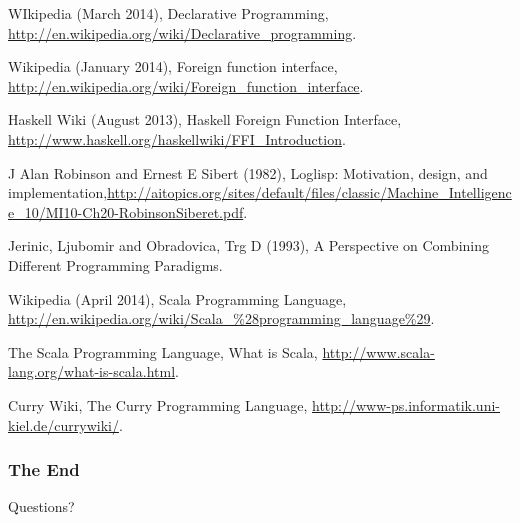 \documentclass[aspectratio=1610]{beamer}
\begin{document}
\begin{frame} [allowframebreaks]
{\begin{thebibliography}{9}
		 WIkipedia (March 2014), Declarative Programming, \url{http://en.wikipedia.org/wiki/Declarative_programming}.
		
		Wikipedia (January 2014), Foreign function interface, \url{http://en.wikipedia.org/wiki/Foreign_function_interface}. 

     Haskell Wiki (August 2013), Haskell Foreign Function Interface, \url {http://www.haskell.org/haskellwiki/FFI_Introduction}. 
		
		J Alan Robinson and Ernest E Sibert (1982), Loglisp: Motivation, design, and implementation,\url{http://aitopics.org/sites/default/files/classic/Machine_Intelligence_10/MI10-Ch20-RobinsonSiberet.pdf}.
		
		Jerinic, Ljubomir and Obradovica, Trg D (1993), A Perspective on Combining Different Programming Paradigms.

		 Wikipedia (April 2014), Scala Programming Language, \url{http://en.wikipedia.org/wiki/Scala_\%28programming_language\%29}.
	
		 The Scala Programming Language, What is Scala, \url{http://www.scala-lang.org/what-is-scala.html}.
		
		 Curry Wiki, The Curry Programming Language, \url{http://www-ps.informatik.uni-kiel.de/currywiki/}.  
\end{thebibliography}
}
\end{frame}




\begin{frame}
\frametitle{The End}
\Huge{\centerline{Questions?}}
\end{frame}

\end{document}
